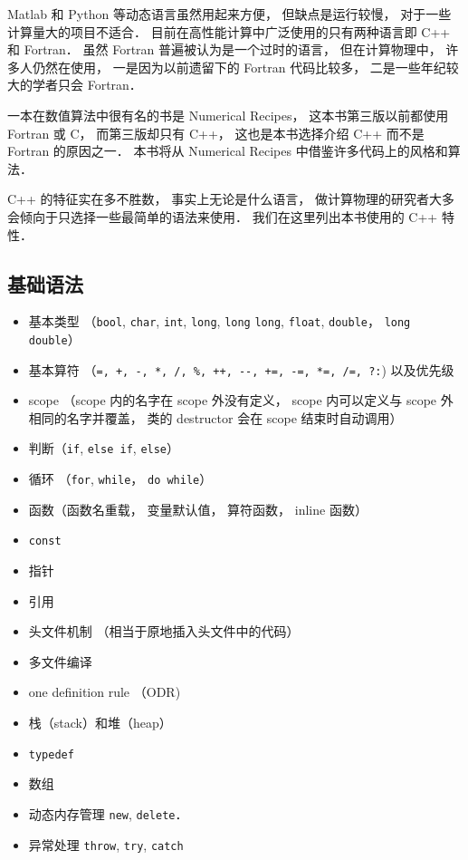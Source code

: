 
Matlab 和 Python 等动态语言虽然用起来方便， 但缺点是运行较慢， 对于一些计算量大的项目不适合． 目前在高性能计算中广泛使用的只有两种语言即 C++ 和 Fortran． 虽然 Fortran 普遍被认为是一个过时的语言， 但在计算物理中， 许多人仍然在使用， 一是因为以前遗留下的 Fortran 代码比较多， 二是一些年纪较大的学者只会 Fortran．

一本在数值算法中很有名的书是 Numerical Recipes， 这本书第三版以前都使用 Fortran 或 C， 而第三版却只有 C++， 这也是本书选择介绍 C++ 而不是 Fortran 的原因之一． 本书将从 Numerical Recipes 中借鉴许多代码上的风格和算法．

C++ 的特征实在多不胜数， 事实上无论是什么语言， 做计算物理的研究者大多会倾向于只选择一些最简单的语法来使用．
我们在这里列出本书使用的 C++ 特性．

\subsection{基础语法}
\begin{itemize}
\item 基本类型 （\verb|bool|, \verb|char|, \verb|int|, \verb|long|, \verb|long| \verb|long|, \verb|float|, \verb|double|， \verb|long double|）
\item 基本算符 （\verb|=, +, -, *, /, %, ++, --, +=, -=, *=, /=, ?:|) 以及优先级
\item scope （scope 内的名字在 scope 外没有定义， scope 内可以定义与 scope 外相同的名字并覆盖， 类的 destructor 会在 scope 结束时自动调用）
\item 判断（\verb|if|, \verb|else if|, \verb|else|）
\item 循环 （\verb|for|, \verb|while|， \verb|do while|）
\item 函数（函数名重载， 变量默认值， 算符函数， inline 函数）
\item \verb|const|
\item 指针
\item 引用
\item 头文件机制 （相当于原地插入头文件中的代码）
\item 多文件编译
\item one definition rule （ODR)
\item 栈（stack）和堆（heap）
\item \verb|typedef|
\item 数组
\item 动态内存管理 \verb|new|, \verb|delete|．
\item 异常处理 \verb|throw|, \verb|try|, \verb|catch|
\end{itemize}

